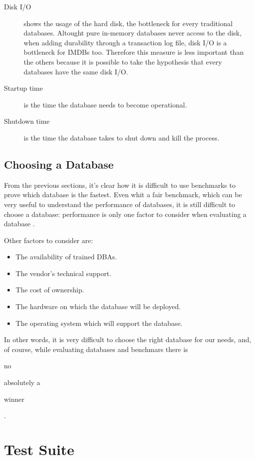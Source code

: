 \begin{description}
	\item[Disk I/O] shows the usage of the hard disk, the bottleneck for every traditional databases. Altought pure in-memory databases never access to the disk, when adding durability through a transaction log file, disk I/O is a bottleneck for IMDBs too. Therefore this measure is less important than the others because it is possible to take the hypothesis that every databases have the same disk I/O.
	
	\item[Startup time] is the time the database needs to become operational. 
	
	\item[Shutdown time] is the time the database takes to shut down and kill the process.
	
\end{description}
	
	\section{Choosing a Database}
From the previous sections, it's clear how it is difficult to use benchmarks to prove which database is the fastest. Even whit a fair benchmark, which can be very useful to understand the performance of databases, it is still difficult to choose a database: performance is only one factor to consider when evaluating a database \cite{burleson}. 

Other factors to consider are:
\begin{itemize}
	\item The availability of trained DBAs.
	\item The vendor's technical support.
	\item The cost of ownership.
	\item The hardware on which the database will be deployed.
	\item The operating system which will support the database.
\end{itemize}

In other words, it is very difficult to choose the right database for our needs, and, of course, while evaluating databases and benchmars there is \begin{bfseries} no \end{bfseries} absolutely a \begin{bfseries} winner \end{bfseries}.


\chapter{Test Suite}	


